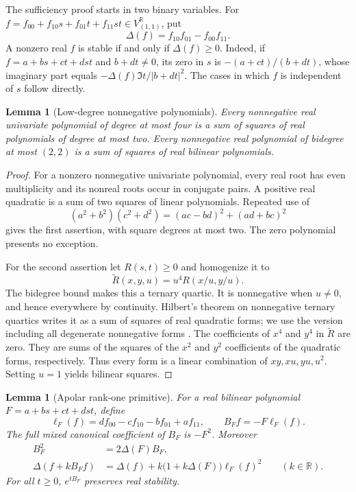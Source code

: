 \documentclass[reqno]{amsart}
\newtheorem{lemma}[theorem]{Lemma}
\theoremstyle{definition}
\theoremstyle{remark}
\newcommand{\R}{\mathbb R}
\begin{document}
The sufficiency proof starts in two binary variables.
For
\(f=f_{00}+f_{10}s+f_{01}t+f_{11}st\in V_{(1,1)}^\R\), put
\[
 \Delta(f)=f_{10}f_{01}-f_{00}f_{11}.
\]
A nonzero real \(f\) is stable if and only if \(\Delta(f)\geq0\).
Indeed, if \(f=a+bs+ct+dst\) and \(b+dt\neq0\), its zero in \(s\)
is \(-(a+ct)/(b+dt)\), whose imaginary part equals
\(-\Delta(f)\Im t/|b+dt|^2\).
The cases in which \(f\) is independent of \(s\) follow directly.

\begin{lemma}[Low-degree nonnegative polynomials]
\label{gen:sos}
Every nonnegative real univariate polynomial of degree at most four is a sum
of squares of real polynomials of degree at most two.
Every nonnegative real polynomial of bidegree at most \((2,2)\)
is a sum of squares of real bilinear polynomials.
\end{lemma}

\begin{proof}
For a nonzero nonnegative univariate polynomial, every real root has
even multiplicity and its nonreal roots occur in conjugate pairs.
A positive real quadratic is a sum of two squares of linear
polynomials.  Repeated use of
\[
 (a^2+b^2)(c^2+d^2)=(ac-bd)^2+(ad+bc)^2
\]
gives the first assertion, with square degrees at most two.
The zero polynomial presents no exception.

For the second assertion let \(R(s,t)\geq0\) and homogenize it to
\[
 \widetilde R(x,y,u)=u^4R(x/u,y/u).
\]
The bidegree bound makes this a ternary quartic.  It is nonnegative
when \(u\neq0\), and hence everywhere by continuity.
Hilbert's theorem on nonnegative ternary quartics writes it as a sum
of squares of real quadratic forms; we use the version including
all degenerate nonnegative forms \cite{PRSS04}.
The coefficients of \(x^4\) and \(y^4\) in \(\widetilde R\) are zero.
They are sums of the squares of the \(x^2\) and \(y^2\) coefficients
of the quadratic forms, respectively.  Thus every form is a linear
combination of \(xy,xu,yu,u^2\).  Setting \(u=1\) yields bilinear
squares.
\end{proof}

\begin{lemma}[Apolar rank-one primitive]
\label{gen:binary-primitive}
For a real bilinear polynomial \(F=a+bs+ct+dst\), define
\[
 \ell_F(f)=d f_{00}-c f_{10}-b f_{01}+a f_{11},
 \qquad
 B_Ff=-F\ell_F(f).
\]
The full mixed canonical coefficient of \(B_F\) is \(-F^2\).
Moreover
\begin{align}
 B_F^2&=2\Delta(F)B_F,
 \label{gen:eq-apolar-square}\\
 \Delta(f+kB_Ff)
 &=\Delta(f)+k\bigl(1+k\Delta(F)\bigr)\ell_F(f)^2
 \qquad(k\in\R).
 \label{gen:eq-apolar-discriminant}
\end{align}
For all \(t\geq0\), \(e^{tB_F}\) preserves real stability.
\end{lemma}
\end{document}
